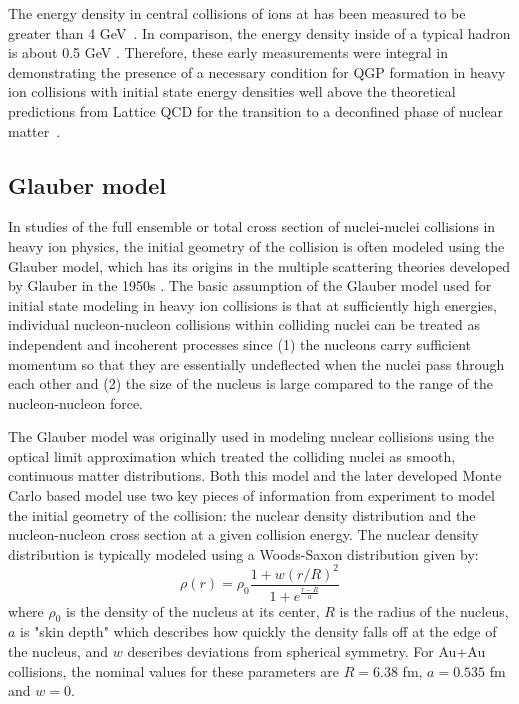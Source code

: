 The energy density in central collisions of \auau ions at \sqsntwo has been measured to be greater than 4 GeV~\cite{STAR_detdeta,PHENIX_detdeta}. 
In comparison, the energy density inside of a typical hadron is about 0.5 GeV \cite{Busza_2018}. 
Therefore, these early \detdeta measurements were integral in demonstrating the presence of a necessary condition for QGP formation in heavy ion collisions with initial state energy densities well above the theoretical predictions from Lattice QCD for the transition to a deconfined phase of nuclear matter~\cite{Aoki:2006we}.

\subsection{Glauber model}

In studies of the full ensemble or total cross section of nuclei-nuclei collisions in heavy ion physics, the initial geometry of the collision is often modeled using the Glauber model, which has its origins in the multiple scattering theories developed by Glauber in the 1950s \cite{glauber_lecture}.
The basic assumption of the Glauber model used for initial state modeling in heavy ion collisions is that at sufficiently high energies, individual nucleon-nucleon collisions within colliding nuclei can be treated as independent and incoherent processes since (1) the nucleons carry sufficient momentum so that they are essentially undeflected when the nuclei pass through each other and (2) the size of the nucleus is large compared to the range of the nucleon-nucleon force.

The Glauber model was originally used in modeling nuclear collisions using the optical limit approximation which treated the colliding nuclei as smooth, continuous matter distributions. 
Both this model and the later developed Monte Carlo based model use two key pieces of information from experiment to model the initial geometry of the collision: the nuclear density distribution and the nucleon-nucleon cross section at a given collision energy.
The nuclear density distribution is typically modeled using a Woods-Saxon distribution given by:
\begin{equation}
    \rho(r) = \rho_0 \frac{1 + w(r/R)^2}{1 + e^{\frac{r-R}{a}}}
\end{equation}
where $\rho_0$ is the density of the nucleus at its center, $R$ is the radius of the nucleus, $a$ is "skin depth" which describes how quickly the density falls off at the edge of the nucleus, and $w$ describes deviations from spherical symmetry. 
For Au+Au collisions, the nominal values for these parameters are $R = 6.38$ fm, $a = 0.535$ fm and $w = 0$.

